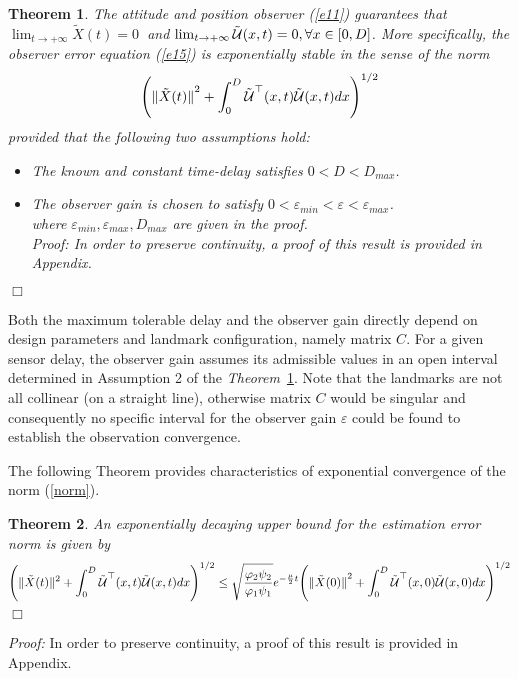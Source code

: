\documentclass[12pt,draftcls,onecolumn]{IEEEtran}
\newtheorem{theo}{Theorem}
\newcommand{\carrew} {\hfill $\Box$}
\begin{document}
\begin{theo} \label{th1} The attitude and position observer (\ref{e11}) guarantees that $\lim_{t \to +\infty} \tilde X(t) =0\ $ and $\lim_{t \to +\infty} \tilde{\cal U}(x,t)=0, \forall x \in [0,D] $. More specifically, the observer error equation (\ref{e15}) is exponentially stable in the sense of the norm
\begin{equation} \label{norm}
{\left( {{{\| {\tilde X(t)} \|}^2} + \int_0^D {{{\tilde {\cal U}}^\top}(x,t)\tilde {\cal U}(x,t)dx} } \right)^{1/2}}
\end{equation}
provided that the following two assumptions hold:
\begin{itemize}
\item[1)] The known and constant time-delay satisfies $0 < D < D_{max}$.
\item[2)] The observer gain is chosen to satisfy $0 <\varepsilon_{min} < \varepsilon < \varepsilon_{max}$.\\
where $\varepsilon_{min},\varepsilon_{max},D_{max}$ are given in the proof.\\
{\it Proof:} In order to preserve continuity, a proof of this result is provided in Appendix. 
\end{itemize} \carrew
\end{theo}

Both the maximum tolerable delay and the observer gain directly depend on design parameters and landmark configuration, namely matrix $C$. For a given sensor delay, the observer gain assumes its admissible values in an open interval determined in Assumption 2 of the \textit{Theorem}~\ref{th1}. Note that the landmarks are not all collinear (on a straight line), otherwise matrix $C$ would be singular and consequently no specific interval for the observer gain $\varepsilon $ could be found to establish the observation convergence.


The following Theorem provides characteristics of exponential convergence of the norm (\ref{norm}).
\begin{theo} \label{th2}  An exponentially decaying upper bound for the estimation error norm is given by
\begin{equation}   \label{e18}
{\left({\| {\tilde X(t)} \|^2} + \int_0^D {{{\tilde {\cal U}}^\top}(x,t)\tilde {\cal U}(x,t)dx}\right)^{1/2}}  \le \sqrt {\frac{{{\varphi _2}{\psi _2}}}{{{\varphi _1}{\psi _1}}}} {e^{ - \frac {\mu}{2} t}}{\left( {{{\| {\tilde X(0)} \|}^2} + \int_0^D {{{\tilde {\cal U}}^\top}(x,0)\tilde {\cal U}(x,0)dx} } \right)^{1/2}}
\end{equation} \carrew
\end{theo}
{\it Proof:} In order to preserve continuity, a proof of this result is provided in Appendix.
\end{document}
